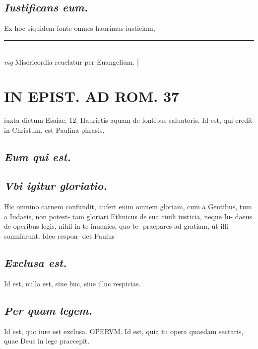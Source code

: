 \documentclass{article}
\begin{document}
\begin{pages}
\subsection*{\textit{Iustificans eum. }}\pstart Ex hoc siquidem fonte omnes haurimus iusticiam,  \pend
\vspace{0.5cm}\noindent
\vspace{0.2cm}\rule{1cm}{0.2pt}\\ 
\hspace{0.2cm}\textit{mg}
\footnotesize Misericordia reuelatur per Euangelium.  
\normalsize| 
\section*{IN EPIST. AD ROM.  37 }
\marginpar{[ p.]}\pstart iuxta dictum Esaiae. 12. Haurietis aquam de fontibus saluatoris.   \pend\pstart Id est, qui credit in Christum, est Paulina phrasis.   \pend
{}
{}
\subsection*{\textit{Eum qui est. }}
{}
\subsection*{\textit{Vbi igitur gloriatio.  }}\pstart Hic omnino carnem confundit, aufert enim omnem gloriam, cum a Gentibus, tum a Iudaeis, non potest- tam gloriari Ethnicus de sua ciuili iusticia, neque Iu- daeus de operibus legis, nihil in te inuenies, quo te- praepares ad gratiam, ut illi somniarunt. Ideo respon- det Paulus  \pend
{}
{}
\subsection*{\textit{Exclusa est. }}\pstart Id est, nulla est, siue huc, siue illuc respicias.   \pend
{}
{}
\subsection*{\textit{Per quam legem. }}\pstart Id est, quo iure est exclusa. OPERVM.  Id est, quia tu opera quaedam sectaris, quae Deus in lege praecepit.  \pend
{}
{}

\end{pages}
\end{document}
